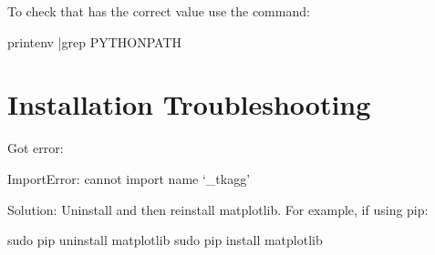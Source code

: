 To check that  has the correct value use the command:
\begin{example}
  printenv |grep PYTHONPATH
\end{example}

\section{Installation Troubleshooting}
\label{s:gui.trouble}

Got error:
\begin{example}
  ImportError: cannot import name ‘_tkagg'
\end{example}

Solution: Uninstall and then reinstall matplotlib. For example, if using pip:
\begin{example}
  sudo pip uninstall matplotlib
  sudo pip install matplotlib
\end{example}
